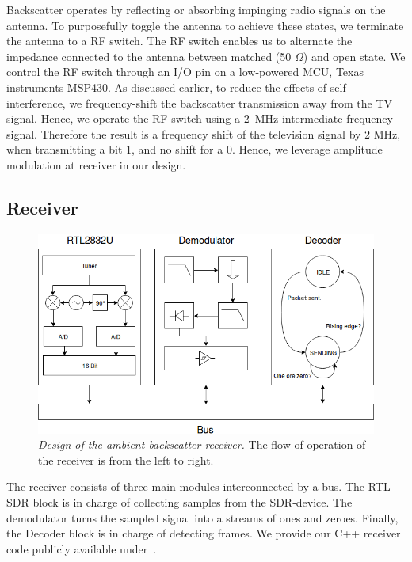 \documentclass[conference]{IEEEtran}
\begin{document}
Backscatter operates by reflecting or absorbing impinging
radio signals on the antenna. To purposefully toggle the antenna
to achieve these states, we  terminate the antenna to a 
RF switch. The RF switch enables us to alternate the impedance connected to
the antenna between matched (50 \ensuremath{\Omega}) and open state.
We control the RF switch through an I/O pin on a low-powered MCU, Texas
instruments MSP430. As discussed earlier, to reduce the effects of
self-interference, we frequency-shift the backscatter transmission
away from the TV signal. Hence, we operate the RF switch using a 
\SI{2}{\mega\hertz} intermediate frequency signal. Therefore the result 
is a frequency shift of the television signal by 2 MHz, when
transmitting a bit 1, and no shift for a 0.  Hence,  we 
leverage amplitude modulation at receiver in our design.
 
\subsection{Receiver}
\begin{figure}[h]
\centering
\includegraphics[width=\columnwidth]{./fig/receiver_arch}
\vspace{-6mm}
\caption{\emph{Design of the ambient backscatter receiver.} The flow of operation of the
receiver is from the left to right.}
\label{fig:receiver_arch}
\vspace{-6mm}
\end{figure}
The receiver consists of three main modules interconnected by a bus. The
RTL-SDR block is in charge of collecting samples from the SDR-device. The
demodulator turns the sampled signal into a streams of ones and zeroes.
Finally, the Decoder block is in charge of detecting frames. We provide our C++
receiver code publicly available under~\cite{s3xm3x_backscatterBASKReceiver}.
\end{document}
